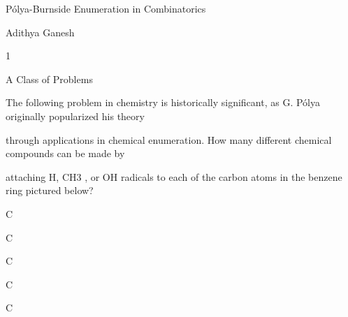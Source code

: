 \documentclass[a4paper,portrait,12pt]{article}
\begin{document}
\begin{flushleft}
P\'{o}lya-Burnside Enumeration in Combinatorics
\end{flushleft}


\begin{flushleft}
Adithya Ganesh
\end{flushleft}





1





\begin{flushleft}
A Class of Problems
\end{flushleft}





\begin{flushleft}
The following problem in chemistry is historically significant, as G. P\'{o}lya originally popularized his theory
\end{flushleft}


\begin{flushleft}
through applications in chemical enumeration. How many different chemical compounds can be made by
\end{flushleft}


\begin{flushleft}
attaching H, CH3 , or OH radicals to each of the carbon atoms in the benzene ring pictured below?
\end{flushleft}


\begin{flushleft}
C
\end{flushleft}





\begin{flushleft}
C
\end{flushleft}





\begin{flushleft}
C
\end{flushleft}





\begin{flushleft}
C
\end{flushleft}





\begin{flushleft}
C
\end{flushleft}
\end{document}
